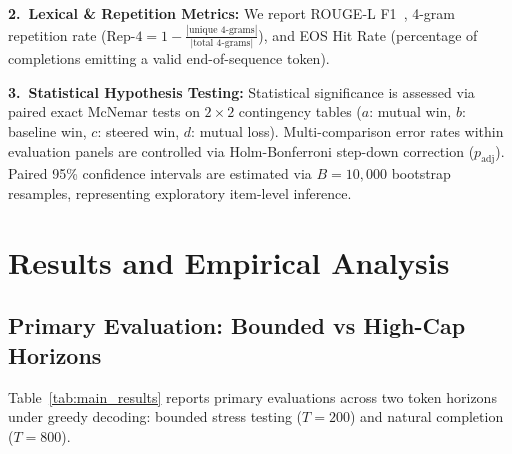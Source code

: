 \documentclass[runningheads]{llncs}
\begin{document}
\noindent\textbf{2.~Lexical \& Repetition Metrics:} We report ROUGE-L F1~\cite{ref14}, 4-gram repetition rate ($\text{Rep-4} = 1 - \frac{|\text{unique 4-grams}|}{|\text{total 4-grams}|}$), and EOS Hit Rate (percentage of completions emitting a valid end-of-sequence token).

\noindent\textbf{3.~Statistical Hypothesis Testing:} Statistical significance is assessed via paired exact McNemar tests on $2\times 2$ contingency tables ($a$: mutual win, $b$: baseline win, $c$: steered win, $d$: mutual loss). Multi-comparison error rates within evaluation panels are controlled via Holm-Bonferroni step-down correction ($p_{\text{adj}}$). Paired 95\% confidence intervals are estimated via $B=10,000$ bootstrap resamples, representing exploratory item-level inference.

\section{Results and Empirical Analysis}\label{sec:results}
\subsection{Primary Evaluation: Bounded vs High-Cap Horizons}
Table~\ref{tab:main_results} reports primary evaluations across two token horizons under greedy decoding: bounded stress testing ($T=200$) and natural completion ($T=800$).
\end{document}

